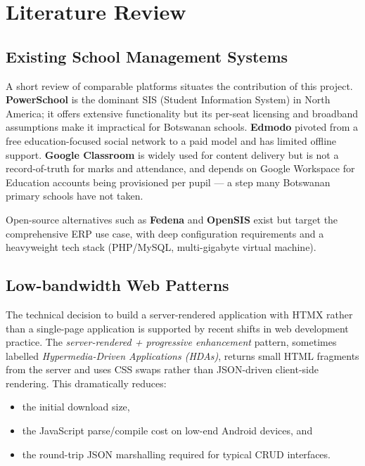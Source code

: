 \documentclass[11pt,a4paper]{article}
\begin{document}
\section{Literature Review}

\subsection{Existing School Management Systems}

A short review of comparable platforms situates the contribution of this
project. \textbf{PowerSchool} is the dominant SIS (Student Information System)
in North America; it offers extensive functionality but its per-seat licensing
and broadband assumptions make it impractical for Botswanan schools.
\textbf{Edmodo} pivoted from a free education-focused social network to a paid
model and has limited offline support. \textbf{Google Classroom} is widely used
for content delivery but is not a record-of-truth for marks and attendance, and
depends on Google Workspace for Education accounts being provisioned per pupil
--- a step many Botswanan primary schools have not taken.

Open-source alternatives such as \textbf{Fedena} and \textbf{OpenSIS} exist but
target the comprehensive ERP use case, with deep configuration requirements and
a heavyweight tech stack (PHP/MySQL, multi-gigabyte virtual machine).

\subsection{Low-bandwidth Web Patterns}

The technical decision to build a server-rendered application with HTMX rather
than a single-page application is supported by recent shifts in web
development practice. The \textit{server-rendered + progressive enhancement}
pattern, sometimes labelled \textit{Hypermedia-Driven Applications (HDAs)},
returns small HTML fragments from the server and uses CSS swaps rather than
JSON-driven client-side rendering. This dramatically reduces:

\begin{itemize}[leftmargin=*]
    \item the initial download size,
    \item the JavaScript parse/compile cost on low-end Android devices, and
    \item the round-trip JSON marshalling required for typical CRUD interfaces.
\end{itemize}
\end{document}
